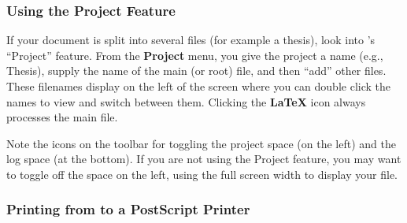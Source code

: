 \documentclass{article}
\begin{document}
\subsubsection{Using the Project Feature}
If your document is split into several files
(for example a thesis), look into 's ``Project'' feature. From the
\textbf{Project} menu, you give the project a name (e.g., Thesis), 
supply the name of the main (or root) file, and then ``add'' other
files. These filenames display on the left of the screen where you can
double click the names to view and switch between them. Clicking
the \textbf{\LaTeX} icon always processes the main file.

Note the icons on the toolbar for toggling the project space (on the left)
and the log space (at the bottom). If you are not using the Project
feature, you may want to toggle off the space on the left, using the full
screen width to display your file.

\subsubsection{Printing from  to a PostScript Printer}
\label{winshell:print}
\end{document}
